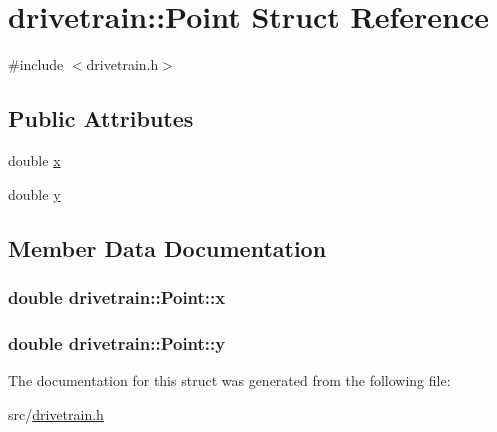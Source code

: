\hypertarget{structdrivetrain_1_1Point}{}\section{drivetrain\+:\+:Point Struct Reference}
\label{structdrivetrain_1_1Point}


{\ttfamily \#include $<$drivetrain.\+h$>$}

\subsection*{Public Attributes}
\begin{DoxyCompactItemize}
\item 
double \hyperlink{structdrivetrain_1_1Point_af57c0438bb35a011c0b67347006b16c8}{x}
\item 
double \hyperlink{structdrivetrain_1_1Point_a08992846eb260c263897cd837232952d}{y}
\end{DoxyCompactItemize}


\subsection{Member Data Documentation}
\subsubsection[{\texorpdfstring{x}{x}}]{\setlength{\rightskip}{0pt plus 5cm}double drivetrain\+::\+Point\+::x}\hypertarget{structdrivetrain_1_1Point_af57c0438bb35a011c0b67347006b16c8}{}\label{structdrivetrain_1_1Point_af57c0438bb35a011c0b67347006b16c8}
\subsubsection[{\texorpdfstring{y}{y}}]{\setlength{\rightskip}{0pt plus 5cm}double drivetrain\+::\+Point\+::y}\hypertarget{structdrivetrain_1_1Point_a08992846eb260c263897cd837232952d}{}\label{structdrivetrain_1_1Point_a08992846eb260c263897cd837232952d}


The documentation for this struct was generated from the following file\+:\begin{DoxyCompactItemize}
\item 
src/\hyperlink{drivetrain_8h}{drivetrain.\+h}\end{DoxyCompactItemize}
